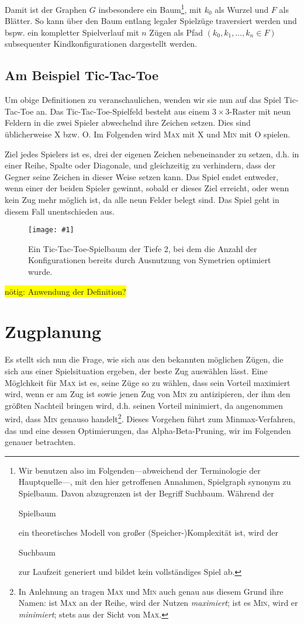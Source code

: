 \documentclass[a4paper,twoside]{scrartcl}
\newcommand\e[1]{\begin{em}#1\end{em}}
\newcommand\q[1]{\glqq #1\grqq}
\newcommand\g[3]{%
  \begin{figure}[!ht]
  \centering
  \texttt{[image: \#1]}
  \caption{#2}
  \end{figure}}
\newcommand\todo[1]{\colorbox{yellow}{#1}}
\begin{document}
Damit ist der Graphen $G$ insbesondere ein Baum\footnote{Wir benutzen also im Folgenden---abweichend der Terminologie der Hauptquelle\cite{K:2016}---, mit den hier getroffenen Annahmen, \q{Spielgraph} synonym zu \q{Spielbaum}. Davon abzugrenzen ist der Begriff \q{Suchbaum}. Während der \e{Spielbaum} ein theoretisches Modell von großer (Speicher-)Komplexität ist, wird der \e{Suchbaum} zur Laufzeit generiert und bildet kein vollständiges Spiel ab.}, mit $k_0$ als Wurzel und $F$ als Blätter. So kann über den Baum entlang legaler Spielzüge traversiert werden und bspw. ein kompletter Spielverlauf mit $n$ Zügen als Pfad $(k_0, k_1, \dots, k_n \in F)$ subsequenter Kindkonfigurationen dargestellt werden.



\subsection{Am Beispiel Tic-Tac-Toe}

Um obige Definitionen zu veranschaulichen, wenden wir sie nun auf das Spiel Tic-Tac-Toe an. Das Tic-Tac-Toe-Spielfeld besteht aus einem $3 \times 3$-Raster mit neun Feldern in die zwei Spieler abwechelnd ihre Zeichen setzen. Dies sind üblicherweise \q{X} bzw. \q{O}. Im Folgenden wird \textsc{Max} mit \q{X} und \textsc{Min} mit \q{O} spielen.

Ziel jedes Spielers ist es, drei der eigenen Zeichen nebeneinander zu setzen, d.h. in einer Reihe, Spalte oder Diagonale, und gleichzeitig zu verhindern, dass der Gegner seine Zeichen in dieser Weise setzen kann. Das Spiel endet entweder, wenn einer der beiden Spieler gewinnt, sobald er dieses Ziel erreicht, oder wenn kein Zug mehr möglich ist, da alle neun Felder belegt sind. Das Spiel geht in diesem Fall unentschieden aus.

\g{tic.pdf}{Ein Tic-Tac-Toe-Spielbaum der Tiefe 2, bei dem die Anzahl der Konfigurationen bereits durch Ausnutzung von Symetrien optimiert wurde.}{0.9}

\todo{nötig: Anwendung der Definition?}

\section{Zugplanung}

Es stellt sich nun die Frage, wie sich aus den bekannten möglichen Zügen, die sich aus einer Spielsituation ergeben, der beste Zug auswählen lässt. Eine Möglchkeit für \textsc{Max} ist es, seine Züge so zu wählen, dass sein Vorteil maximiert wird, wenn er am Zug ist sowie jenen Zug von \textsc{Min} zu antizipieren, der ihm den größten Nachteil bringen wird, d.h. seinen Vorteil minimiert, da angenommen wird, dass \textsc{Min} genauso handelt\footnote{In Anlehnung an \cite{R:2012} tragen \textsc{Max} und \textsc{Min} auch genau aus diesem Grund ihre Namen: ist \textsc{Max} an der Reihe, wird der Nutzen \textit{maximiert}; ist es \textsc{Min}, wird er \textit{minimiert}; stets aus der Sicht von \textsc{Max}.}. Dieses Vorgehen führt zum Minmax-Verfahren, das und eine dessen Optimierungen, das Alpha-Beta-Pruning, wir im Folgenden genauer betrachten. 
\end{document}
